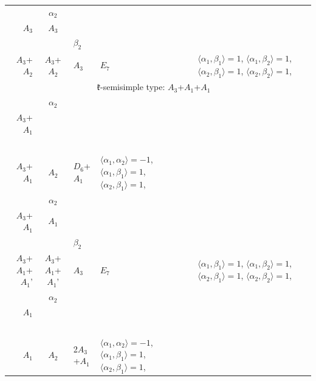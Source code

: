 \documentclass[12pt]{report}
\begin{document}
\begin{appendix}
{\begin{longtable}{rcl p{1cm}p{1cm}p{3cm} }
\begin{tabular}{cc}$\alpha_1$+ & $\alpha_2$\\\tiny{ $A_3$ } & \tiny{ $A_3$ }\end{tabular} &\begin{tabular}{c} = \\~ \end{tabular} & \begin{tabular}{cc}$\beta_1$+ & $\beta_2$\\\tiny{ $A_3$+$A_2$ } & \tiny{ $A_3$+$A_2$ }\end{tabular} & $A_3$ & $E_7$ &  $\langle\alpha_1, \beta_1\rangle=1$, $\langle\alpha_1, \beta_2\rangle=1$, $\langle\alpha_2, \beta_1\rangle=1$, $\langle\alpha_2, \beta_2\rangle=1$, 
\\
\hline\multicolumn{5}{c}{$\mathfrak{k}$-semisimple type: $A_3$+$A_1$+$A_1$}\\
\hline\hline\begin{tabular}{cc}$\alpha_1$+ & $\alpha_2$\\\tiny{ $A_3$+$A_1$ } & \tiny{  }\end{tabular} &\begin{tabular}{c} = \\~ \end{tabular} & \begin{tabular}{c}$\beta_1$\\\tiny{ $A_3$+$A_1$ }\end{tabular} & $A_2$ & $D_6$+$A_1$ & $\langle\alpha_1, \alpha_2\rangle=-1$,  $\langle\alpha_1, \beta_1\rangle=1$, $\langle\alpha_2, \beta_1\rangle=1$, 
\\
\begin{tabular}{cc}$\alpha_1$+ & $\alpha_2$\\\tiny{ $A_3$+$A_1$ } & \tiny{ $A_1$ }\end{tabular} &\begin{tabular}{c} = \\~ \end{tabular} & \begin{tabular}{cc}$\beta_1$+ & $\beta_2$\\\tiny{ $A_3$+$A_1$+$A_1$' } & \tiny{ $A_3$+$A_1$+$A_1$' }\end{tabular} & $A_3$ & $E_7$ &  $\langle\alpha_1, \beta_1\rangle=1$, $\langle\alpha_1, \beta_2\rangle=1$, $\langle\alpha_2, \beta_1\rangle=1$, $\langle\alpha_2, \beta_2\rangle=1$, 
\\
\begin{tabular}{cc}$\alpha_1$+ & $\alpha_2$\\\tiny{ $A_1$ } & \tiny{  }\end{tabular} &\begin{tabular}{c} = \\~ \end{tabular} & \begin{tabular}{c}$\beta_1$\\\tiny{ $A_1$ }\end{tabular} & $A_2$ & 2$A_3$+$A_1$ & $\langle\alpha_1, \alpha_2\rangle=-1$,  $\langle\alpha_1, \beta_1\rangle=1$, $\langle\alpha_2, \beta_1\rangle=1$, 

\end{longtable}}
\end{appendix}
\end{document}
